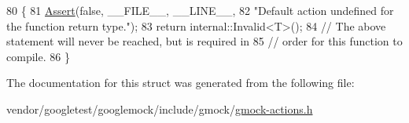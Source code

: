 \begin{DoxyCode}
80                  \{
81     \hyperlink{namespacetesting_1_1internal_a7a259643b7f2d23ce2b757728df42c99}{Assert}(\textcolor{keyword}{false}, \_\_FILE\_\_, \_\_LINE\_\_,
82            \textcolor{stringliteral}{"Default action undefined for the function return type."});
83     \textcolor{keywordflow}{return} internal::Invalid<T>();
84     \textcolor{comment}{// The above statement will never be reached, but is required in}
85     \textcolor{comment}{// order for this function to compile.}
86   \}
\end{DoxyCode}


The documentation for this struct was generated from the following file\+:\begin{DoxyCompactItemize}
\item 
vendor/googletest/googlemock/include/gmock/\hyperlink{gmock-actions_8h}{gmock-\/actions.\+h}\end{DoxyCompactItemize}
